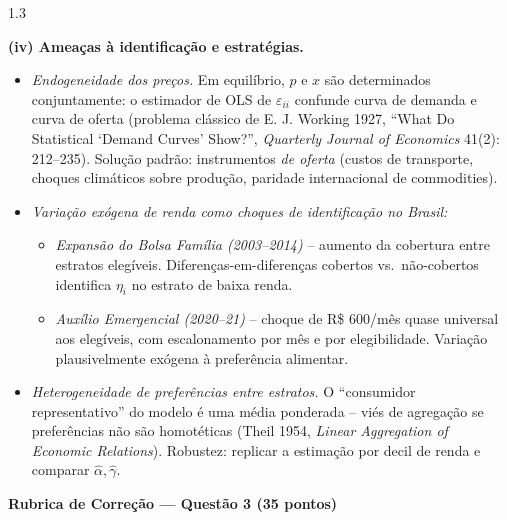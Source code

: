 \documentclass[11pt,addpoints]{exam}
\begin{document}
\begin{spacing}{1.3}
\begin{questions}
\begin{parts}
\begin{solution}
\textbf{(iv) Ameaças à identificação e estratégias.}
\begin{itemize}[noitemsep]
\item \emph{Endogeneidade dos preços.} Em equilíbrio, $p$ e $x$ são determinados conjuntamente: o estimador de OLS de $\varepsilon_{ii}$ confunde curva de demanda e curva de oferta (problema clássico de E. J. Working 1927, ``What Do Statistical `Demand Curves' Show?'', \textit{Quarterly Journal of Economics} 41(2): 212--235). Solução padrão: instrumentos \emph{de oferta} (custos de transporte, choques climáticos sobre produção, paridade internacional de commodities).
\item \emph{Variação exógena de renda como choques de identificação no Brasil:}
\begin{itemize}[noitemsep]
\item \emph{Expansão do Bolsa Família (2003--2014)} -- aumento da cobertura entre estratos elegíveis. Diferenças-em-diferenças cobertos vs.\ não-cobertos identifica $\eta_i$ no estrato de baixa renda.
\item \emph{Auxílio Emergencial (2020--21)} -- choque de R\$ 600/mês quase universal aos elegíveis, com escalonamento por mês e por elegibilidade. Variação plausivelmente exógena à preferência alimentar.
\end{itemize}
\item \emph{Heterogeneidade de preferências entre estratos.} O ``consumidor representativo'' do modelo é uma média ponderada -- viés de agregação se preferências não são homotéticas (Theil 1954, \textit{Linear Aggregation of Economic Relations}). Robustez: replicar a estimação por decil de renda e comparar $\hat\alpha, \hat\gamma$.
\end{itemize}
\end{solution}

\end{parts}

\ifprintanswers
\vspace{1em}
{\color{rubred}
\noindent\textbf{Rubrica de Correção --- Questão 3 (35 pontos)}
\vspace{0.3em}

}
\end{questions}
\end{spacing}
\end{document}

